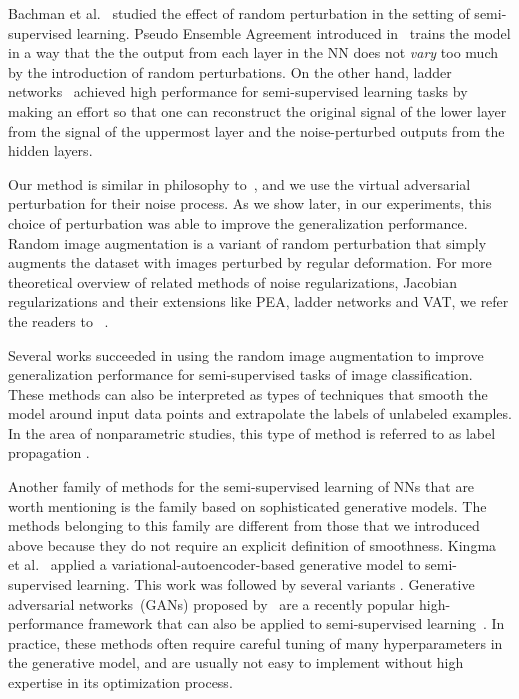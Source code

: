 \documentclass[10pt,journal,compsoc]{IEEEtran}
\newcommand\mnote[1]{\textcolor{blue}{(MIYATO: #1)}}
\newcommand\mwrite[1]{\textcolor{green}{Miyato: #1}}
\begin{document}
Bachman et al.~\cite{bachman2014learning} studied the effect of random perturbation in the setting of semi-supervised learning.
Pseudo Ensemble Agreement introduced in~\cite{bachman2014learning} trains the model in a way that the the output from each layer in the NN does not \textit{vary} too much by the introduction of random perturbations.
On the other hand, ladder networks~\cite{rasmus2015semi} achieved high performance for semi-supervised learning tasks by making an effort so that one can reconstruct the original signal of the lower layer from the signal of the uppermost layer and the noise-perturbed outputs from the hidden layers. 

Our method is similar in philosophy to~\cite{bachman2014learning}, and we use the virtual adversarial perturbation for their noise process.
As we show later, in our experiments, this choice of perturbation was able to improve the generalization performance. 
Random image augmentation is a variant of random perturbation that simply augments the dataset with images perturbed by regular deformation.
For more theoretical overview of related methods of noise regularizations, Jacobian regularizations and their extensions like PEA\cite{bachman2014learning}, ladder networks\cite{rasmus2015semi} and VAT, we refer the readers to ~\cite{abbas2016understanding}.  

Several works \cite{laine2016temporal,sajjadi2016regularization} succeeded in using the random image augmentation to improve generalization performance for semi-supervised tasks of image classification. 
These methods can also be interpreted as types of techniques that smooth the model around input data points and extrapolate the labels of unlabeled examples. 
In the area of nonparametric studies, this type of method is referred to as label propagation \cite{zhu2002learning}. 

Another family of methods for the semi-supervised learning of NNs that are worth mentioning is the family based on sophisticated generative models.
The methods belonging to this family are different from those that we introduced above because they do not require an explicit definition of smoothness. 
Kingma et al.~\cite{kingma2014semi} applied a variational-autoencoder-based generative model to semi-supervised learning. 
This work was followed by several variants \cite{maaloe2016auxiliary}.
Generative adversarial networks~(GANs) proposed by~\cite{goodfellow2014generative} are a recently popular high-performance framework that can also be applied to semi-supervised learning~\cite{springenberg2015unsupervised, salimans2016improved}.
In practice, these methods often require careful tuning of many hyperparameters in the generative model, and are usually not easy to implement without high expertise in its optimization process. %
\end{document}
